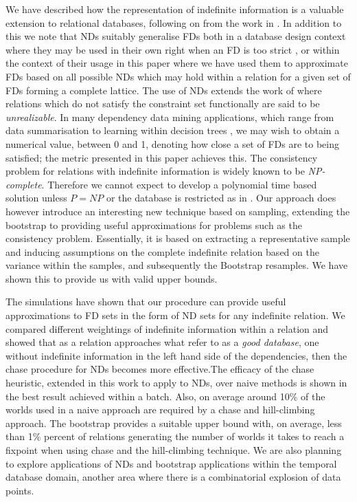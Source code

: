 We have described how the representation of indefinite information is a 
valuable extension to relational databases, following on from the work
in \cite{inv91,vn95}. In addition to this we 
note that NDs suitably generalise FDs
both in a database design context where they may be used in their
own right when an FD is too strict \cite{gm85b}, or within the context of their
usage in this paper where we have used them to approximate FDs based
on all possible NDs which may hold within a relation for a given set of FDs forming a complete lattice.  The use of NDs extends the work of \cite{vn95}
where relations which do not satisfy the constraint set functionally are
said to be {\em unrealizable}. In many dependency data mining applications,
which range from data summarisation to learning within decision trees \cite{psm93}, we may wish to obtain a numerical value, between 0 and 1, denoting how close a set of 
FDs are to being satisfied; the metric presented in this paper achieves
this. 
The consistency problem for relations with indefinite information is
widely known to be {\em NP-complete}. Therefore we cannot expect to
develop a polynomial time based solution unless $P = NP$ or the database is
restricted as in \cite{vn95}. Our approach
does however introduce an interesting new technique based on sampling,
extending the bootstrap to providing useful approximations for
problems such as the consistency problem. Essentially, it is based on
extracting a representative sample and inducing assumptions on the 
complete indefinite relation based on the variance within the samples, and
subsequently the Bootstrap resamples. We have shown this to provide us
with valid upper bounds.

\medskip

The simulations have shown that our procedure can provide useful
approximations to FD sets in the form of ND sets for any indefinite
relation. We compared different weightings of indefinite information within
a relation and showed that as a relation approaches what \cite{vn95}
refer to as a {\em good database}, one without indefinite information
in the left hand side of the dependencies, then the chase procedure for
NDs becomes more effective.The efficacy of the chase heuristic, extended in
this work to apply to NDs, over naive methods is shown in the
best result achieved within a batch. Also, on average around 10\% of 
the worlds used in 
a naive approach are required by a chase and hill-climbing approach.
The bootstrap provides a suitable upper bound with, on average, 
less than 1\% percent of relations generating the number of worlds it
takes to reach a fixpoint when using chase and the hill-climbing technique.
We are also planning to explore applications of NDs and bootstrap
applications within the temporal database domain, another area where
there is a combinatorial explosion of data points.

